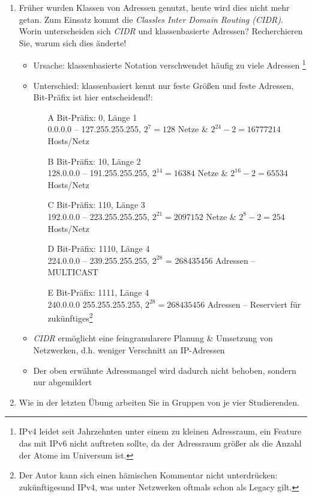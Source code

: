 \documentclass[paper=a4,fontsize=11pt]{scrartcl}%
\numberwithin{equation}{section}
\begin{document}
\begin{enumerate}
	\item Früher wurden Klassen von Adressen genutzt, heute wird dies nicht mehr getan. Zum Einsatz kommt die \emph{Classles Inter Domain Routing (CIDR)}. Worin unterscheiden sich \emph{CIDR} und klassenbasierte Adressen? Recherchieren Sie, warum sich dies änderte!
	\begin{itemize}
		\item Ursache: klassenbasierte Notation verschwendet häufig zu viele Adressen \footnote{IPv4 leidet seit Jahrzehnten unter einem zu kleinen Adressraum, ein Feature das mit IPv6 nicht auftreten sollte, da der Adressraum größer als die Anzahl der Atome im Universum ist.}
		\item Unterschied: klassenbasiert kennt nur feste Größen und feste Adressen, Bit-Präfix ist hier entscheidend!:
		\begin{itemize}
			\item[A] Bit-Präfix: 0, Länge 1\\
			0.0.0.0 -- 127.255.255.255, $2^7 = 128$ Netze \& $2^{24} - 2 = 16777214$ Hosts/Netz
			\item[B] Bit-Präfix: 10, Länge 2\\
			128.0.0.0 -- 191.255.255.255, $2^{14} = 16384$ Netze \& $2^{16} - 2 = 65534$Hosts/Netz 
			\item[C] Bit-Präfix: 110, Länge 3\\
			192.0.0.0 -- 223.255.255.255, $2^{21} = 2097152$ Netze \& $2^8 - 2 = 254$ Hosts/Netz
			\item[D] Bit-Präfix: 1110, Länge 4\\
			224.0.0.0 -- 239.255.255.255, $2^{28}$ = 268435456 Adressen -- MULTICAST
			\item[E] Bit-Präfix: 1111, Länge 4\\
			240.0.0.0	255.255.255.255, $2^{28} = 268435456$ Adressen -- Reserviert für \glqq zukünftiges\grqq \footnote{Der Autor kann sich einen hämischen Kommentar nicht unterdrücken: \glqq zukünftiges\grqq und IPv4, was unter Netzwerken oftmals schon als Legacy gilt. }
		\end{itemize}
		\item \emph{CIDR} ermöglicht eine feingranularere Planung \& Umsetzung von Netzwerken, d.h. weniger Verschnitt an IP-Adressen
		\item Der oben erwähnte Adressmangel wird dadurch nicht behoben, sondern nur abgemildert
	\end{itemize}
	\item Wie in der letzten Übung arbeiten Sie in Gruppen von je vier Studierenden.\\

\end{enumerate}
\end{document}
